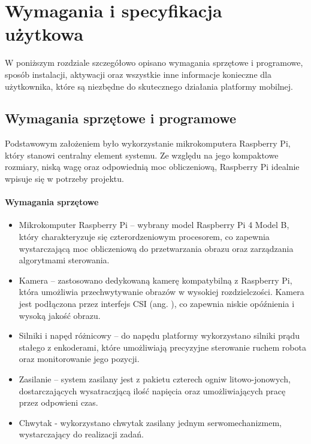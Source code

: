 \chapter{Wymagania i specyfikacja użytkowa}
\label{ch:04}

W poniższym rozdziale szczegółowo opisano wymagania sprzętowe i programowe, sposób instalacji, aktywacji oraz wszystkie inne informacje konieczne dla użytkownika, które są niezbędne do skutecznego działania platformy mobilnej. 

\section{Wymagania sprzętowe i programowe}

Podstawowym założeniem było wykorzystanie mikrokomputera Raspberry Pi, który stanowi centralny element systemu. Ze względu na jego kompaktowe rozmiary, niską wagę oraz odpowiednią moc obliczeniową, Raspberry Pi idealnie wpisuje się w potrzeby projektu.

\subsubsection*{Wymagania sprzętowe}

\begin{itemize}
    \item Mikrokomputer Raspberry Pi – wybrany model Raspberry Pi 4 Model B, który charakteryzuje się czterordzeniowym procesorem, co zapewnia wystarczającą moc obliczeniową do przetwarzania obrazu oraz zarządzania algorytmami sterowania.
    \item Kamera – zastosowano dedykowaną kamerę kompatybilną z Raspberry Pi, która umożliwia przechwytywanie obrazów w wysokiej rozdzielczości. Kamera jest podłączona przez interfejs CSI (ang. ), co zapewnia niskie opóźnienia i wysoką jakość obrazu.
    \item Silniki i napęd różnicowy – do napędu platformy wykorzystano silniki prądu stałego z enkoderami, które umożliwiają precyzyjne sterowanie ruchem robota oraz monitorowanie jego pozycji.
    \item Zasilanie – system zasilany jest z pakietu czterech ogniw litowo-jonowych, dostarczających wysatraczjącą ilość napięcia oraz umożliwiających pracę przez odpowieni czas.
    \item Chwytak - wykorzystano chwytak zasilany jednym serwomechanizmem, wystarczający do realizacji zadań. 
\end{itemize}

